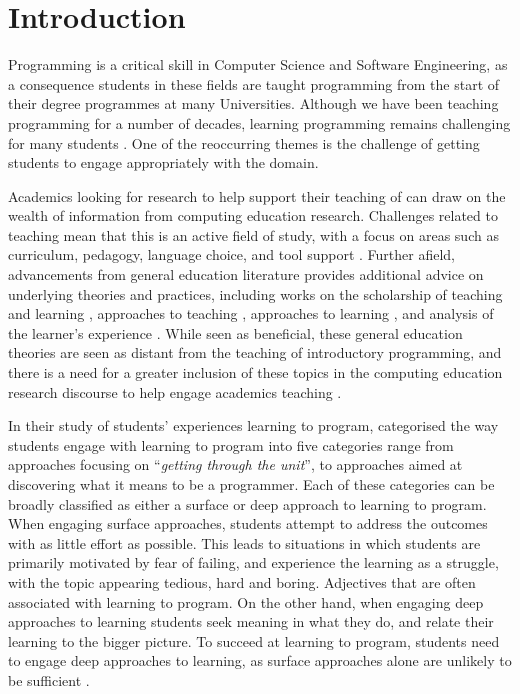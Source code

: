 \chapter{Introduction} %
\label{cha:introduction}

Programming is a critical skill in Computer Science and Software Engineering, as a consequence students in these fields are taught programming from the start of their degree programmes at many Universities. Although we have been teaching programming for a number of decades, learning programming remains challenging for many students \cite{Jenkins:2002,Lister:2004,McCracken:2001,Ragonis:2007,Robins:2003,Rountree:2002,Renumol:2010,Wiedenbeck:2005}. One of the reoccurring themes is the challenge of getting students to engage appropriately with the domain.

Academics looking for research to help support their teaching of \IP can draw on the wealth of information from computing education research. Challenges related to teaching \IP mean that this is an active field of study, with a focus on areas such as curriculum, pedagogy, language choice, and tool support \cite{Pears:2007}. Further afield, advancements from general education literature provides additional advice on underlying theories and practices, including works on the scholarship of teaching and learning \cite{Boyer:1990}, approaches to teaching \cite{Martin:2000}, approaches to learning \cite{Marton:1976a,Trigwell:1999}, and analysis of the learner's experience \cite{Marton:1997}. While seen as beneficial, these general education theories are seen as distant from the teaching of introductory programming, and there is a need for a greater inclusion of these topics in the computing education research discourse to help engage academics teaching \IP.

In their study of students' experiences learning to program, \citet{Bruce:2003} categorised the way students engage with learning to program into five categories range from approaches focusing on ``\emph{getting through the unit}'', to approaches aimed at discovering what it means to be a programmer. Each of these categories can be broadly classified as either a surface or deep approach \cite{Marton:1976a,Ramsden:1992} to learning to program. When engaging surface approaches, students attempt to address the outcomes with as little effort as possible. This leads to situations in which students are primarily motivated by fear of failing, and experience the learning as a struggle, with the topic appearing tedious, hard and boring. Adjectives that are often associated with learning to program. On the other hand, when engaging deep approaches to learning students seek meaning in what they do, and relate their learning to the bigger picture. To succeed at learning to program, students need to engage deep approaches to learning, as surface approaches alone are unlikely to be sufficient \cite{Bruce:2003}.

